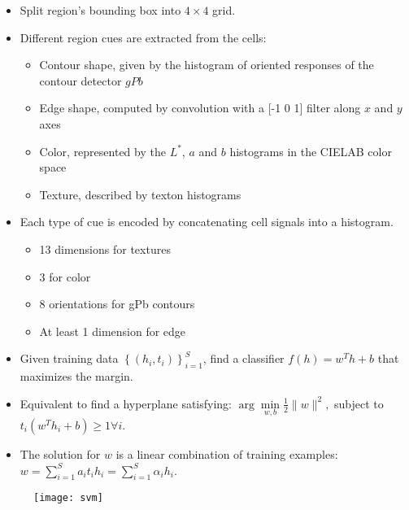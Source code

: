 \documentclass[11pt, a4paper, landscape]{article}
\begin{document}
\NewPage{}
\vfill
\begin{itemize}
\item Split region's bounding box into $4 \times 4$ grid.
\item Different region cues are extracted from the cells:
\begin{itemize}
\item Contour shape, given by the histogram of oriented responses of the contour detector $gPb$
\item Edge shape, computed by convolution with a [-1 0 1] filter along $x$ and $y$ axes
\item Color, represented by the $L^*$, $a$ and $b$ histograms in the CIELAB color space
\item Texture, described by texton histograms
\end{itemize}
\item Each type of cue is encoded by concatenating cell signals into a histogram.
\begin{itemize}
\item 13 dimensions for textures
\item 3 for color
\item 8 orientations for gPb contours
\item At least 1 dimension for edge
\end{itemize}
\end{itemize}
\vfill


\NewPage{}
\vfill
\begin{itemize}
\item Given training data $\left\lbrace (h_i, t_i) \right\rbrace _{i = 1} ^S$, find a classifier $f(h) = w^Th + b$ that maximizes the margin.
\vfill
\item Equivalent to find a hyperplane satisfying: $\arg\min\limits_{w, b} \frac{1}{2} \|w\| ^2,$ subject to $t_i(w^Th_i + b) \geq 1 \forall i$.
\vfill
\item The solution for $w$ is a linear combination of training examples: $w = \sum\limits_{i = 1}^{S} a_it_ih_i = \sum\limits_{i = 1}^{S} \alpha_ih_i$.
\end{itemize}
\begin{figure}
	\centering
	\texttt{[image: svm]}
\end{figure}
\vfill
\end{document}
